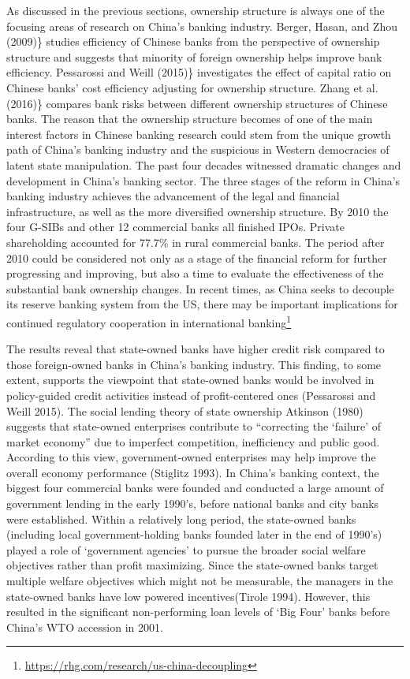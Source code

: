 \documentclass{article}
\begin{document}
As discussed in the previous sections, ownership structure is always one
of the focusing areas of research on China's banking industry. Berger,
Hasan, and Zhou (2009)\} studies efficiency of Chinese banks from the
perspective of ownership structure and suggests that minority of foreign
ownership helps improve bank efficiency. Pessarossi and Weill (2015)\}
investigates the effect of capital ratio on Chinese banks' cost
efficiency adjusting for ownership structure. Zhang et al. (2016)\}
compares bank risks between different ownership structures of Chinese
banks. The reason that the ownership structure becomes of one of the
main interest factors in Chinese banking research could stem from the
unique growth path of China's banking industry and the suspicious in
Western democracies of latent state manipulation. The past four decades
witnessed dramatic changes and development in China's banking sector.
The three stages of the reform in China's banking industry achieves the
advancement of the legal and financial infrastructure, as well as the
more diversified ownership structure. By 2010 the four G-SIBs and other
12 commercial banks all finished IPOs. Private shareholding accounted
for 77.7\% in rural commercial banks. The period after 2010 could be
considered not only as a stage of the financial reform for further
progressing and improving, but also a time to evaluate the effectiveness
of the substantial bank ownership changes. In recent times, as China
seeks to decouple its reserve banking system from the US, there may be
important implications for continued regulatory cooperation in
international banking\footnote{\url{https://rhg.com/research/us-china-decoupling}}

The results reveal that state-owned banks have higher credit risk
compared to those foreign-owned banks in China's banking industry. This
finding, to some extent, supports the viewpoint that state-owned banks
would be involved in policy-guided credit activities instead of
profit-centered ones (Pessarossi and Weill 2015). The social lending
theory of state ownership Atkinson (1980) suggests that state-owned
enterprises contribute to ``correcting the `failure' of market economy''
due to imperfect competition, inefficiency and public good. According to
this view, government-owned enterprises may help improve the overall
economy performance (Stiglitz 1993). In China's banking context, the
biggest four commercial banks were founded and conducted a large amount
of government lending in the early 1990's, before national banks and
city banks were established. Within a relatively long period, the
state-owned banks (including local government-holding banks founded
later in the end of 1990's) played a role of `government agencies' to
pursue the broader social welfare objectives rather than profit
maximizing. Since the state-owned banks target multiple welfare
objectives which might not be measurable, the managers in the
state-owned banks have low powered incentives(Tirole 1994). However,
this resulted in the significant non-performing loan levels of `Big
Four' banks before China's WTO accession in 2001.
\end{document}
